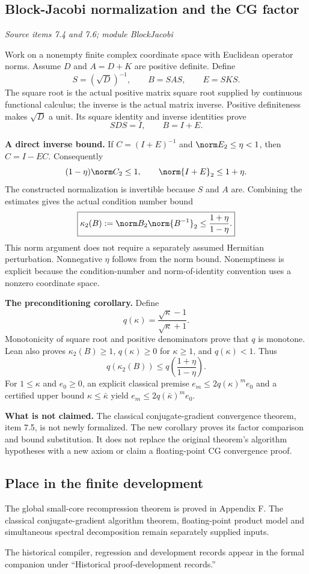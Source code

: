 \subsection{Block-Jacobi normalization and the CG factor}\label{supp5:subsection:006}\textit{Source items 7.4 and 7.6; module BlockJacobi}\par
Work on a nonempty finite complex coordinate space with Euclidean operator norms. Assume $D$ and $A=D+K$ are positive definite. Define
\[
S=(\sqrt D)^{-1},\qquad B=SAS,\qquad E=SKS.
\]
The square root is the actual positive matrix square root supplied by continuous functional calculus; the inverse is the actual matrix inverse. Positive definiteness makes $\sqrt D$ a unit. Its square identity and inverse identities prove
\[
SDS=I,\qquad B=I+E.
\]

\textbf{A direct inverse bound.} If $C=(I+E)^{-1}$ and $\norm E_2\leq\eta<1$, then $C=I-EC$. Consequently
\[
(1-\eta)\norm C_2\leq 1,
\qquad \norm{I+E}_2\leq 1+\eta.
\]
The constructed normalization is invertible because $S$ and $A$ are. Combining the estimates gives the actual condition number bound
\[
\boxed{\kappa_2(B):=\norm B_2\norm{B^{-1}}_2
\leq\frac{1+\eta}{1-\eta}.}
\]
This norm argument does not require a separately assumed Hermitian perturbation. Nonnegative $\eta$ follows from the norm bound. Nonemptiness is explicit because the condition-number and norm-of-identity convention uses a nonzero coordinate space.

\textbf{The preconditioning corollary.} Define
\[
q(\kappa)=\frac{\sqrt\kappa-1}{\sqrt\kappa+1}.
\]
Monotonicity of square root and positive denominators prove that $q$ is monotone. Lean also proves $\kappa_2(B)\geq1$, $q(\kappa)\geq0$ for $\kappa\geq1$, and $q(\kappa)<1$. Thus
\[
\boxed{q(\kappa_2(B))\leq q\!\left(\frac{1+\eta}{1-\eta}\right).}
\]
For $1\leq\kappa$ and $e_0\geq0$, an explicit classical premise $e_m\leq2q(\kappa)^m e_0$ and a certified upper bound $\kappa\leq\bar\kappa$ yield $e_m\leq2q(\bar\kappa)^m e_0$.

\textbf{What is not claimed.} The classical conjugate-gradient convergence theorem, item 7.5, is not newly formalized. The new corollary proves its factor comparison and bound substitution. It does not replace the original theorem's algorithm hypotheses with a new axiom or claim a floating-point CG convergence proof.



\subsection{Place in the finite development}\label{supp5:subsection:007}
The global small-core recompression theorem is proved in Appendix F. The classical conjugate-gradient algorithm theorem, floating-point product model and simultaneous spectral decomposition remain separately supplied inputs.

The historical compiler, regression and development records appear in the formal companion under ``Historical proof-development records.''
